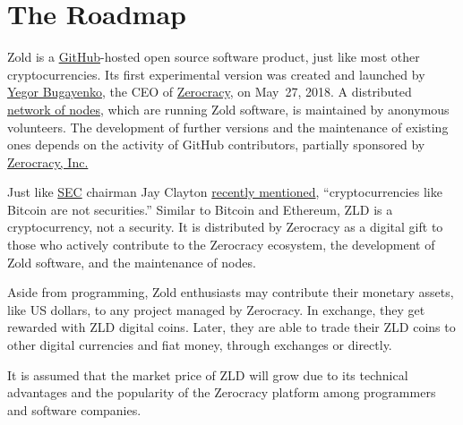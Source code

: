 \documentclass{main}
\begin{document}
\pagebreak

\section*{The Roadmap}

Zold is a \href{https://github.com/zold-io}{GitHub}-hosted open source
software product, just like most other cryptocurrencies.
Its first experimental version was created and launched by \href{https://www.yegor256.com}{Yegor Bugayenko},
the CEO of \href{https://www.zerocracy.com}{Zerocracy}, on May~27, 2018.
A distributed \href{http://www.zold.io/map.html}{network of nodes},
which are running Zold software, is maintained by
anonymous volunteers. The development of further versions and the
maintenance of existing ones depends on the activity of GitHub
contributors, partially sponsored by \href{https://www.zerocracy.com}{Zerocracy, Inc.}

Just like \href{https://www.sec.gov/}{SEC} chairman Jay Clayton
\href{https://www.cnbc.com/video/2018/06/06/sec-chairman-cryptocurrencies-like-bitcoin--not-securities.html}{recently mentioned},
``cryptocurrencies like Bitcoin are not securities.''
Similar to Bitcoin and Ethereum, ZLD is a cryptocurrency, not a security.
It is distributed by Zerocracy as a digital gift to those who
actively contribute to the Zerocracy ecosystem, the development of Zold software,
and the maintenance of nodes.

Aside from programming, Zold enthusiasts may contribute their monetary assets,
like US dollars, to any project managed by Zerocracy.
In exchange, they get rewarded with ZLD digital coins.
Later, they are able to trade their ZLD coins to other digital currencies
and fiat money, through exchanges or directly.

It is assumed that the market price of ZLD will grow due to its technical
advantages and the popularity of the Zerocracy platform among programmers
and software companies.
\end{document}
